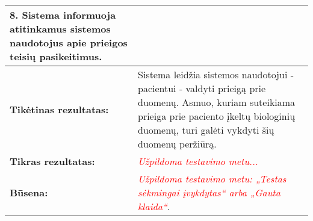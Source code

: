 \documentclass[12pt]{article}
\begin{document}
\begin{table}[htb!]
\begin{tabular}{|m{6cm}|m{11cm}|}
{{            \textbf{8.} {Sistema informuoja atitinkamus sistemos naudotojus apie
            prieigos teisių pasikeitimus.}
        }} \\
        \hline
        \raggedleft \textbf{\cellcolor{deepchampagne}Tikėtinas rezultatas:}
        & Sistema leidžia sistemos naudotojui - pacientui - valdyti prieigą prie
        duomenų. Asmuo, kuriam suteikiama prieiga prie paciento įkeltų
        biologinių duomenų, turi galėti vykdyti šių duomenų peržiūrą. \\
        \hline
        \raggedleft \textbf{\cellcolor{deepchampagne}Tikras rezultatas:}
        & \textcolor{red}{\emph{Užpildoma testavimo metu...}} \\
        \hline
        \raggedleft \textbf{\cellcolor{deepchampagne}Būsena:}
        & \textcolor{red}{\emph{Užpildoma testavimo metu: „Testas sėkmingai
        įvykdytas“ arba „Gauta klaida“}}. \\
        \hline
    \end{tabular}
    \label{table:TS_3}
\end{table}

\newpage

\end{document}
